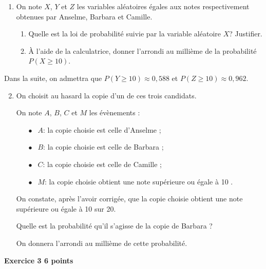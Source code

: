 \documentclass[10pt,a4paper]{article}
\begin{document}
\medskip

\begin{enumerate}
\item On note $X$, $Y$ et $Z$ les variables aléatoires égales aux notes respectivement obtenues par Anselme, Barbara et Camille.

	\begin{enumerate}
		\item Quelle est la loi de probabilité suivie par la variable aléatoire $X$? Justifier.
		\item À l'aide de la calculatrice, donner l'arrondi au millième de la probabilité $P(X \geqslant 10)$.
	\end{enumerate}
\end{enumerate}

Dans la suite, on admettra que $P(Y\geqslant 10) \approx 0,588$ et $P(Z\geqslant 10)\approx 0,962$.

\begin{enumerate}
\setcounter{enumi}{1}
\item On choisit au hasard la copie d'un de ces trois candidats.

On note $A$, $B$, $C$ et $M$ les évènements :

\setlength\parindent{15mm}
\begin{itemize}
\item[$\bullet~~$] $A$: \og la copie choisie est celle d'Anselme \fg{};
\item[$\bullet~~$] $B$: \og la copie choisie est celle de Barbara \fg{};
\item[$\bullet~~$] $C$: \og la copie choisie est celle de Camille \fg{};
\item[$\bullet~~$] $M$: \og la copie choisie obtient une note supérieure ou égale à 10 \fg{}. 
\end{itemize}
\setlength\parindent{0mm}

\smallskip

On constate, après l'avoir corrigée, que la copie choisie obtient une note supérieure ou égale à 10 sur 20.

\smallskip

Quelle est la probabilité qu'il s'agisse de la copie de Barbara ?

On donnera l'arrondi au millième de cette probabilité.
\end{enumerate}

\vspace{0,25cm}

\textbf{Exercice 3 \hfill 6 points}
\end{document}
